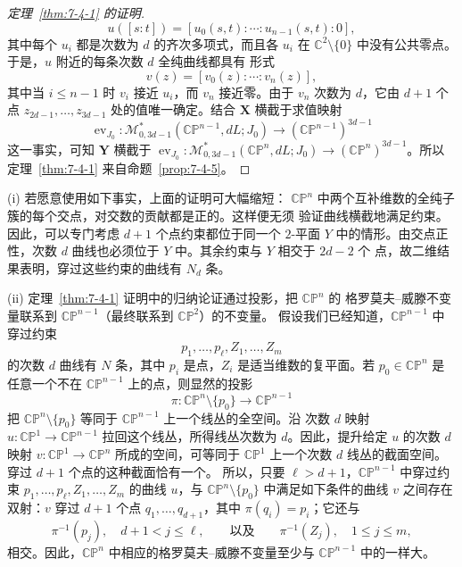 \begin{proof}[定理~\ref{thm:7-4-1} 的证明]
\[
  u([s:t])=[u_0(s,t):\cdots:u_{n-1}(s,t):0],
\]
其中每个 $u_i$ 都是次数为 $d$ 的齐次多项式，而且各 $u_i$ 在
$\mathbb C^2\setminus\{0\}$ 中没有公共零点。于是，$u$ 附近的每条次数 $d$ 全纯曲线都具有
形式
\[
  v(z)=[v_0(z):\cdots:v_n(z)],
\]
其中当 $i\le n-1$ 时 $v_i$ 接近 $u_i$，而 $v_n$ 接近零。由于 $v_n$ 次数为 $d$，它由
$d+1$ 个点 $z_{2d-1},\ldots,z_{3d-1}$ 处的值唯一确定。结合
$\mathbf X$ 横截于求值映射
\[
  \operatorname{ev}_{J_0}:
  \mathcal M^*_{0,3d-1}(\mathbb{CP}^{n-1},dL;J_0)
  \longrightarrow(\mathbb{CP}^{n-1})^{3d-1}
\]
这一事实，可知 $\mathbf Y$ 横截于
$\operatorname{ev}_{J_0}:\mathcal M^*_{0,3d-1}(\mathbb{CP}^n,dL;J_0)\longrightarrow
(\mathbb{CP}^n)^{3d-1}$。所以定理~\ref{thm:7-4-1} 来自命题~\ref{prop:7-4-5}。
\end{proof}

\begin{remark}\label{rem:7-4-10}
\textup{(i)} 若愿意使用如下事实，上面的证明可大幅缩短：
$\mathbb{CP}^n$ 中两个互补维数的全纯子簇的每个交点，对交数的贡献都是正的。这样便无须
验证曲线横截地满足约束。因此，可以专门考虑 $d+1$ 个点约束都位于同一个 $2$-平面 $Y$
中的情形。由交点正性，次数 $d$ 曲线也必须位于 $Y$ 中。其余约束与 $Y$ 相交于 $2d-2$ 个
点，故二维结果表明，穿过这些约束的曲线有 $N_d$ 条。

\textup{(ii)} 定理~\ref{thm:7-4-1} 证明中的归纳论证通过投影，把 $\mathbb{CP}^n$ 的
格罗莫夫--威滕不变量联系到 $\mathbb{CP}^{n-1}$（最终联系到 $\mathbb{CP}^2$）的不变量。
假设我们已经知道，$\mathbb{CP}^{n-1}$ 中穿过约束
\[
  p_1,\ldots,p_\ell,Z_1,\ldots,Z_m
\]
的次数 $d$ 曲线有 $N$ 条，其中 $p_i$ 是点，$Z_i$ 是适当维数的复平面。若
$p_0\in\mathbb{CP}^n$ 是任意一个不在 $\mathbb{CP}^{n-1}$ 上的点，则显然的投影
\[
  \pi:\mathbb{CP}^n\setminus\{p_0\}
  \longrightarrow\mathbb{CP}^{n-1}
\]
把 $\mathbb{CP}^n\setminus\{p_0\}$ 等同于 $\mathbb{CP}^{n-1}$ 上一个线丛的全空间。沿
次数 $d$ 映射 $u:\mathbb{CP}^1\to\mathbb{CP}^{n-1}$ 拉回这个线丛，所得线丛次数为
$d$。因此，提升给定 $u$ 的次数 $d$ 映射
$v:\mathbb{CP}^1\to\mathbb{CP}^n$ 所成的空间，可等同于
$\mathbb{CP}^1$ 上一个次数 $d$ 线丛的截面空间。穿过 $d+1$ 个点的这种截面恰有一个。
所以，只要 $\ell>d+1$，$\mathbb{CP}^{n-1}$ 中穿过约束
$p_1,\ldots,p_\ell,Z_1,\ldots,Z_m$ 的曲线 $u$，与
$\mathbb{CP}^n\setminus\{p_0\}$ 中满足如下条件的曲线 $v$ 之间存在双射：$v$ 穿过
$d+1$ 个点 $q_1,\ldots,q_{d+1}$，其中 $\pi(q_i)=p_i$；它还与
\[
  \pi^{-1}(p_j),\quad d+1<j\le\ell,
  \qquad\text{以及}\qquad
  \pi^{-1}(Z_j),\quad1\le j\le m,
\]
相交。因此，$\mathbb{CP}^n$ 中相应的格罗莫夫--威滕不变量至少与
$\mathbb{CP}^{n-1}$ 中的一样大。


\end{remark}
